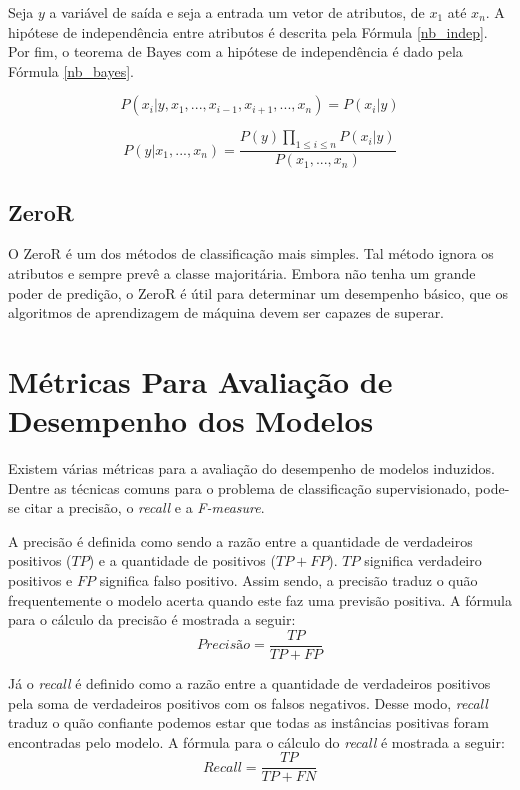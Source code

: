 Seja $y$ a variável de saída e seja a entrada um vetor de atributos, de $x_1$ até
$x_n$. A hipótese de independência entre atributos é descrita pela Fórmula \ref{nb_indep}.
Por fim, o teorema de Bayes com a hipótese de independência é dado pela Fórmula
\ref{nb_bayes}.  

\begin{equation}
    \label{nb_indep}
    P(x_i |y, x_1, ..., x_{i-1}, x_{i+1}, ..., x_n) = P(x_i | y)
\end{equation}

\begin{equation}
    \label{nb_bayes}
    P(y | x_1, ..., x_n) = \frac{P(y)\prod_{1 \le i \le n} P(x_i|y)}{P(x_1, ..., x_n)}
\end{equation}


\subsection{ZeroR}
O ZeroR é um dos métodos de classificação mais simples. Tal método ignora os
atributos e sempre prevê a classe majoritária. Embora não tenha um grande poder de
predição, o ZeroR é útil para determinar um desempenho básico, que os algoritmos de
aprendizagem de máquina devem ser capazes de superar. 

\section{Métricas Para Avaliação de Desempenho dos Modelos}
Existem várias métricas para a avaliação do desempenho de modelos induzidos. Dentre
as técnicas comuns para o problema de classificação supervisionado, pode-se citar a
precisão, o \textit{recall} e a \textit{F-measure}.  

\par A precisão é definida como sendo a razão entre a quantidade de verdadeiros
positivos ($TP$) e a quantidade de positivos ($TP + FP$). $TP$ significa verdadeiro
positivos e $FP$ significa falso positivo. Assim sendo, a precisão traduz o quão
frequentemente o modelo acerta quando este faz uma previsão positiva.  A fórmula para
o cálculo da precisão é mostrada a seguir: 
\begin{equation}
    Precisão = \frac{TP}{TP + FP}
\end{equation}

Já o \textit{recall} é definido como a razão entre a quantidade de verdadeiros
positivos pela soma de verdadeiros positivos com os falsos negativos. Desse modo,
\textit{recall} traduz o quão confiante podemos estar que todas as instâncias
positivas foram encontradas pelo modelo. A fórmula para o cálculo do \textit{recall} é
mostrada a seguir: 
\begin{equation}
    Recall = \frac{TP}{TP + FN}
\end{equation}

